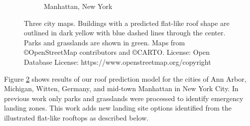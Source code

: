 \begin{figure}[!ht]
\begin{subfigure}[b]{0.30\textwidth}
   \caption{Manhattan, New York}\label{fig:ch5_ny-flat}
 \end{subfigure}
 \caption[Maps of predicted flat rooftops]{Three city maps. Buildings with a predicted flat-like roof shape are outlined in dark yellow with blue dashed lines through the center.  Parks and grasslands are shown in green. Maps from \copyright OpenStreetMap contributors and \copyright CARTO. License: Open Database License: https://www.openstreetmap.org/copyright}\label{fig:ch5_all_flat_buildings}
\end{figure}

Figure \ref{fig:ch5_all_flat_buildings} shows results of our roof prediction model for the cities of Ann Arbor, Michigan, Witten, Germany, and mid-town Manhattan in New York City. In previous work only parks and grasslands were processed to identify emergency landing zones. This work adds new landing site options identified from the illustrated flat-like rooftops as described below. 




